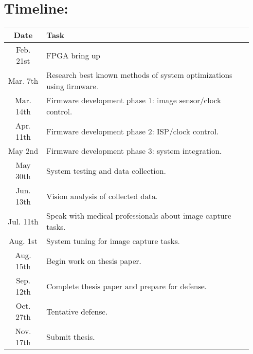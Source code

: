 \section{Timeline:}

\begin{tabular}{|c|>{\raggedright\arraybackslash}p{}|}
    \hline
        \textbf{Date} & \textbf{Task} \\
    \hline
        Feb. 21st & FPGA bring up \\
    \hline
        Mar. 7th & Research best known methods of system optimizations using firmware. \\
    \hline
        Mar. 14th & Firmware development phase 1: image sensor/clock control. \\
    \hline
        Apr. 11th & Firmware development phase 2: ISP/clock control. \\
    \hline
        May 2nd & Firmware development phase 3: system integration. \\
    \hline
        May 30th & System testing and data collection. \\
    \hline
        Jun. 13th & Vision analysis of collected data. \\
    \hline
        Jul. 11th & Speak with medical professionals about image capture tasks. \\
    \hline
        Aug. 1st & System tuning for image capture tasks. \\
    \hline
        Aug. 15th & Begin work on thesis paper. \\
    \hline
        Sep. 12th & Complete thesis paper and prepare for defense. \\
    \hline
        Oct. 27th & Tentative defense. \\
    \hline
        Nov. 17th & Submit thesis. \\
    \hline
\end{tabular}
